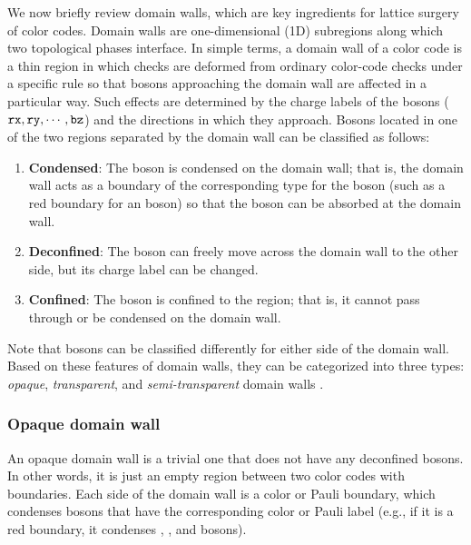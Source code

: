 \documentclass[
 prx,
 reprint,
 superscriptaddress,
 longbibliography,
 dvipsnames
]{revtex4-2}
\begin{document}
We now briefly review domain walls, which are key ingredients for lattice surgery of color codes.
Domain walls are one-dimensional (1D) subregions along which two topological phases interface.
In simple terms, a domain wall of a color code is a thin region in which checks are deformed from ordinary color-code checks under a specific rule so that bosons approaching the domain wall are affected in a particular way.
Such effects are determined by the charge labels of the bosons ($\texttt{rx}, \texttt{ry}, \cdots, \texttt{bz}$) and the directions in which they approach.
Bosons located in one of the two regions separated by the domain wall can be classified as follows:
\begin{enumerate}
    \item \textbf{Condensed}: The boson is condensed on the domain wall; that is, the domain wall acts as a boundary of the corresponding type for the boson (such as a red boundary for an \rx boson) so that the boson can be absorbed at the domain wall.
    \item \textbf{Deconfined}: The boson can freely move across the domain wall to the other side, but its charge label can be changed.
    \item \textbf{Confined}: The boson is confined to the region; that is, it cannot pass through or be condensed on the domain wall.
\end{enumerate}
Note that bosons can be classified differently for either side of the domain wall.
Based on these features of domain walls, they can be categorized into three types: \textit{opaque}, \textit{transparent}, and \textit{semi-transparent} domain walls \cite{kesselring2022anyon}.

\subsubsection{Opaque domain wall}
An opaque domain wall is a trivial one that does not have any deconfined bosons.
In other words, it is just an empty region between two color codes with boundaries.
Each side of the domain wall is a color or Pauli boundary, which condenses bosons that have the corresponding color or Pauli label (e.g., if it is a red boundary, it condenses \rx, \ry, and \rz bosons).
\end{document}
